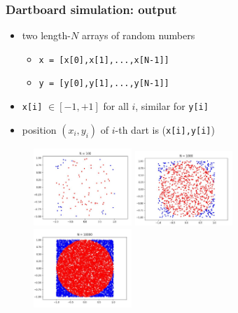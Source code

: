 \documentclass[english,14pt]{beamer}
\begin{document}

\begin{frame}[fragile]

\frametitle{Dartboard simulation: output}

\begin{itemize}
	\item two length-$N$ arrays of random numbers
	\begin{itemize}
		\item \texttt{x = [x[0],x[1],...,x[N-1]]}
		\item \texttt{y = [y[0],y[1],...,y[N-1]]}
	\end{itemize}
	\item \texttt{x[i]} $\in [-1,+1]$ for all $i$, similar for \texttt{y[i]}
	\item position $(x_i,y_i)$ of $i$-th dart is (\texttt{x[i],y[i]})
\end{itemize}

\begin{figure}[ht]
	\centering
	\includegraphics[width=0.33\textwidth]{figures/dartboard100}%
	\pause
	\includegraphics[width=0.33\textwidth]{figures/dartboard1000}%
	\pause
	\includegraphics[width=0.33\textwidth]{figures/dartboard10000}
\end{figure}

\end{frame}
\end{document}
